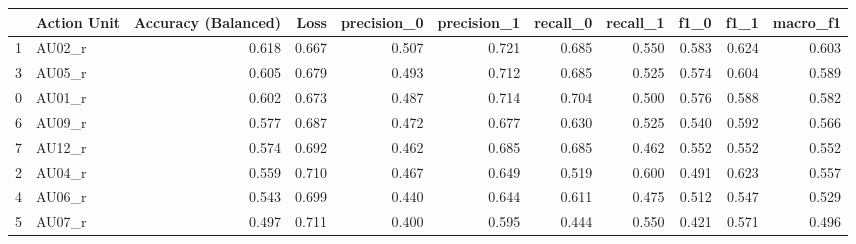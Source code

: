 \begin{tabular}{llrrrrrrrrr}
\toprule
 & Action Unit & Accuracy (Balanced) & Loss & precision_0 & precision_1 & recall_0 & recall_1 & f1_0 & f1_1 & macro_f1 \\
\midrule
1 & AU02_r & 0.618 & 0.667 & 0.507 & 0.721 & 0.685 & 0.550 & 0.583 & 0.624 & 0.603 \\
3 & AU05_r & 0.605 & 0.679 & 0.493 & 0.712 & 0.685 & 0.525 & 0.574 & 0.604 & 0.589 \\
0 & AU01_r & 0.602 & 0.673 & 0.487 & 0.714 & 0.704 & 0.500 & 0.576 & 0.588 & 0.582 \\
6 & AU09_r & 0.577 & 0.687 & 0.472 & 0.677 & 0.630 & 0.525 & 0.540 & 0.592 & 0.566 \\
7 & AU12_r & 0.574 & 0.692 & 0.462 & 0.685 & 0.685 & 0.462 & 0.552 & 0.552 & 0.552 \\
2 & AU04_r & 0.559 & 0.710 & 0.467 & 0.649 & 0.519 & 0.600 & 0.491 & 0.623 & 0.557 \\
4 & AU06_r & 0.543 & 0.699 & 0.440 & 0.644 & 0.611 & 0.475 & 0.512 & 0.547 & 0.529 \\
5 & AU07_r & 0.497 & 0.711 & 0.400 & 0.595 & 0.444 & 0.550 & 0.421 & 0.571 & 0.496 \\
\bottomrule
\end{tabular}
